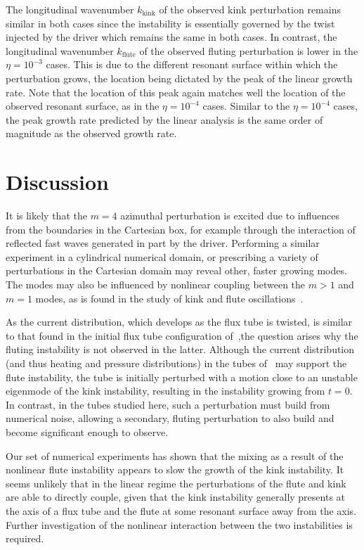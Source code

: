 \documentclass[fleqn,usenatbib]{mnras}
\begin{document}
The longitudinal wavenumber $k_{\text{kink}}$ of the observed kink perturbation remains similar in both cases since the instability is essentially governed by the twist injected by the driver which remains the same in both cases. In contrast, the longitudinal wavenumber $k_{\text{flute}}$ of the observed fluting perturbation is lower in the $\eta=10^{-3}$ cases. This is due to the different resonant surface within which the perturbation grows, the location being dictated by the peak of the linear growth rate. Note that the location of this peak again matches well the location of the observed resonant surface, as in the $\eta=10^{-4}$ cases. Similar to the $\eta=10^{-4}$ cases, the peak growth rate predicted by the linear analysis is the same order of magnitude as the observed growth rate.

\section{Discussion}
\label{sec-discussion}

It is
likely that the $m=4$ azimuthal perturbation is excited due to
influences from the boundaries in the Cartesian box, for example
through the interaction of reflected fast waves generated in part by
the driver. Performing a similar experiment in a cylindrical numerical
domain, or prescribing a variety of perturbations in the Cartesian
domain may reveal other, faster growing modes. The modes may also be
influenced by nonlinear coupling between the $m>1$ and $m=1$ modes, as
is found in the study of kink and flute
oscillations~\citep{terradasEffectMagneticTwist2018,rudermanNonlinearGenerationFluting2017}. 

As the current distribution, which develops as the flux tube is twisted, is similar to that found in the initial flux tube configuration of~\cite{quinnEffectAnisotropicViscosity2020},the question arises why the fluting instability is not observed in the latter. Although the current distribution (and thus heating and pressure distributions) in the tubes of~\cite{quinnEffectAnisotropicViscosity2020} may support the flute instability, the tube is initially perturbed with a motion close to an unstable eigenmode of the kink instability, resulting in the instability growing from $t=0$. In contrast, in the tubes studied here, such a perturbation must build from numerical noise, allowing a secondary, fluting perturbation to also build and become significant enough to observe.

Our set of numerical experiments has
shown that the mixing as a result of the nonlinear flute
instability appears to slow the growth of the kink instability. It seems unlikely that in
 the linear regime the perturbations of the
flute and kink are able to directly couple, given that
the kink instability generally presents at the axis of a flux tube and
the flute at some resonant surface away from the
axis. Further investigation of the nonlinear interaction between the
two instabilities is required. 
\end{document}
